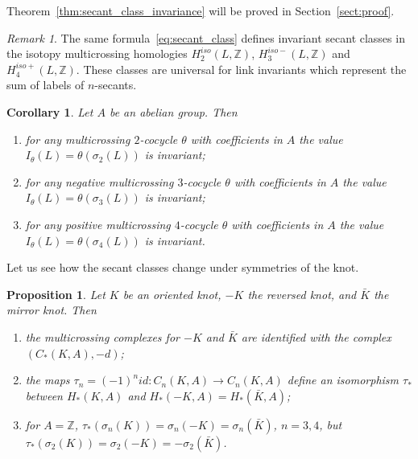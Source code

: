 \documentclass{article}
\newtheorem{corollary}{Corollary}
\newtheorem{proposition}{Proposition}
\theoremstyle{definition}
\theoremstyle{remark}
\newtheorem{remark}{Remark}
\def\Z{{\mathbb Z}}
\begin{document}
Theorem~\ref{thm:secant_class_invariance} will be proved in Section~\ref{sect:proof}.

\begin{remark}\label{rem:isotopic_secant_classes}
    The same formula~\eqref{eq:secant_class} defines invariant secant classes in the isotopy multicrossing homologies $H^{iso}_2(L,\Z)$, $H^{iso-}_3(L,\Z)$ and $H^{iso+}_4(L,\Z)$. These classes are universal for link invariants which represent the sum of labels of $n$-secants.
\end{remark}

\begin{corollary}\label{cor:secant_cocycle_invariant}
Let $A$ be an abelian group. Then
\begin{enumerate}
    \item for any multicrossing $2$-cocycle $\theta$ with coefficients in $A$ the value $I_\theta(L)=\theta(\sigma_2(L))$ is invariant;
    \item for any negative multicrossing $3$-cocycle $\theta$ with coefficients in $A$ the value $I_\theta(L)=\theta(\sigma_3(L))$ is invariant;
    \item for any positive multicrossing $4$-cocycle $\theta$ with coefficients in $A$ the value $I_\theta(L)=\theta(\sigma_4(L))$ is invariant.
\end{enumerate}
\end{corollary}

Let us see how the secant classes change under symmetries of the knot.

\begin{proposition}\label{prop:knot_symmetries_secant_class}
    Let $K$ be  an oriented knot, $-K$ the reversed knot, and $\bar K$ the mirror knot. Then
\begin{enumerate}
    \item the multicrossing complexes for $-K$ and $\bar K$ are identified with the complex $(C_*(K,A), -d)$;
    \item the maps $\tau_n=(-1)^n id\colon C_n(K,A)\to C_n(K,A)$ define an isomorphism $\tau_*$ between $H_*(K,A)$ and $H_*(-K,A)=H_*(\bar K,A)$;
    \item for $A=\Z$, $\tau_*(\sigma_n(K))=\sigma_n(-K)=\sigma_n(\bar K)$, $n=3,4$, but $\tau_*(\sigma_2(K))=\sigma_2(-K)=-\sigma_2(\bar K)$.
\end{enumerate}
\end{proposition}
\end{document}
